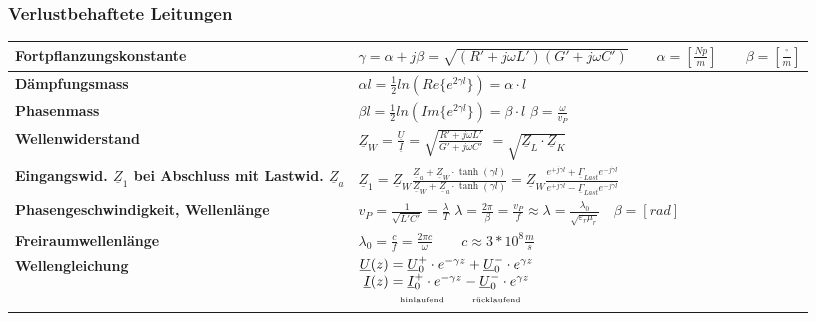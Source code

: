 	\subsubsection{Verlustbehaftete Leitungen}
		\renewcommand{\arraystretch}{1.5}
		\begin{tabular}{| p{7.7cm} | l |}
			\hline
				\textbf{Fortpflanzungskonstante}
				& $\gamma=\alpha+j\beta=\sqrt{(R'+j\omega L')(G'+j\omega C')}\qquad
				\alpha=[\frac{Np}{m}] \qquad \beta=[\frac{^\circ}{m}]$\\
			\hline
				\textbf{Dämpfungsmass}
				& $\alpha l= \frac{1}{2}ln(Re\{e^{2\gamma l}\})=\alpha\cdot l$\\
			\hline
				\textbf{Phasenmass}
				& $\beta l=\frac{1}{2}ln(Im\{e^{2\gamma l}\})= \beta\cdot l$ \qquad
				$\beta=\frac{\omega}{v_P}$\\
			\hline
				\textbf{Wellenwiderstand}
				& $\underline{Z}_W=\frac{\underline{U}}{\underline{I}}=\sqrt{\frac{R'+j\omega L'}{G'+j\omega C'}}$
				$=\sqrt{\underline{Z}_L \cdot \underline{Z}_K}$\\
			\hline
				\textbf{Eingangswid. $\underline{Z}_1$  bei Abschluss mit
				Lastwid. $\underline{Z}_a$} &
				$\underline{Z}_1 = \underline{Z}_W
				\frac{\underline{Z}_a+\underline{Z}_W \cdot \tanh(\gamma
				l)}{\underline{Z}_W+\underline{Z}_a \cdot \tanh(\gamma l)}
				= \underline{Z}_W \frac{e^{+j \gamma l} + \underline{\Gamma}_{Last} e^{- j \gamma l}}
				{e^{+j \gamma l} - \underline{\Gamma}_{Last} e^{- j \gamma l}}$\\
			\hline
				\textbf{Phasengeschwindigkeit, Wellenlänge}
				& $v_P=\frac{1}{\sqrt{L'C'}}=\frac{\lambda}{T}$ \qquad
				\qquad $\lambda=\frac{2\pi}{\beta}=\frac{v_P}{f} \approx
				\lambda=\frac{\lambda_0}{\sqrt{\varepsilon_r \mu_r}} \quad \beta=[rad]$\\
			\hline
				\textbf{Freiraumwellenlänge}
				& $\lambda_0=\frac{c}{f}=\frac{2\pi c}{\omega} \qquad c\approx 3*10^8 \frac{m}{s}$\\
			\hline
				\textbf{Wellengleichung}
				& $\begin{matrix}
                   	\underline{U}(z)=\underline{U}^+_0 \cdot e^{-\gamma z} + \underline{U}^-_0 \cdot e^{\gamma z}\\
                   	\underline{I}(z)=\underline{I}^+_0 \cdot e^{-\gamma z} - \underline{U}^-_0 \cdot e^{\gamma z}\\
                   	\qquad \text{\tiny hinlaufend}\qquad\text{\tiny rücklaufend}
                \end{matrix}$\\

\end{tabular}
